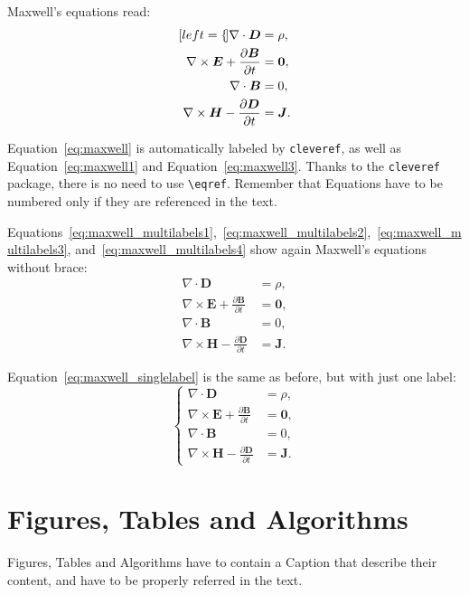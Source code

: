 \documentclass{Configuration_Files/PoliMi3i_thesis}
\begin{document}
Maxwell's equations read:
\begin{subequations}
\label{eq:maxwell}
\begin{align}[left=\empheqlbrace]
\nabla\cdot \bm{D} & = \rho, \label{eq:maxwell1} \\
\nabla \times \bm{E} +  \frac{\partial \bm{B}}{\partial t} & = \bm{0}, \label{eq:maxwell2} \\
\nabla\cdot \bm{B} & = 0, \label{eq:maxwell3} \\
\nabla \times \bm{H} - \frac{\partial \bm{D}}{\partial t} &= \bm{J}. \label{eq:maxwell4}
\end{align}
\end{subequations}

Equation~\eqref{eq:maxwell} is automatically labeled by \texttt{cleveref},
as well as Equation~\eqref{eq:maxwell1} and Equation~\eqref{eq:maxwell3}.
Thanks to the \verb|cleveref| package, there is no need to use \verb|\eqref|.
Remember that Equations have to be numbered only if they are referenced in the text.

Equations~\eqref{eq:maxwell_multilabels1},~\eqref{eq:maxwell_multilabels2},~\eqref{eq:maxwell_multilabels3},
and~\eqref{eq:maxwell_multilabels4} show again Maxwell's equations without brace:
\begin{align}
\nabla\cdot \bm{D} & = \rho, \label{eq:maxwell_multilabels1} \\
\nabla \times \bm{E} +  \frac{\partial \bm{B}}{\partial t} &= \bm{0}, \label{eq:maxwell_multilabels2} \\
\nabla\cdot \bm{B} & = 0, \label{eq:maxwell_multilabels3} \\
\nabla \times \bm{H} - \frac{\partial \bm{D}}{\partial t} &= \bm{J} \label{eq:maxwell_multilabels4}.
\end{align}

Equation~\eqref{eq:maxwell_singlelabel} is the same as before,
but with just one label:
\begin{equation}
\label{eq:maxwell_singlelabel}
\left\{
\begin{aligned}
\nabla\cdot \bm{D} & = \rho, \\
\nabla \times \bm{E} +  \frac{\partial \bm{B}}{\partial t} &= \bm{0},\\
\nabla\cdot \bm{B} & = 0, \\
\nabla \times \bm{H} - \frac{\partial \bm{D}}{\partial t} &= \bm{J}.
\end{aligned}
\right.
\end{equation}

\section{Figures, Tables and Algorithms}
Figures, Tables and Algorithms have to contain a Caption that describe their content, and have to be properly
referred in the text.
\end{document}
